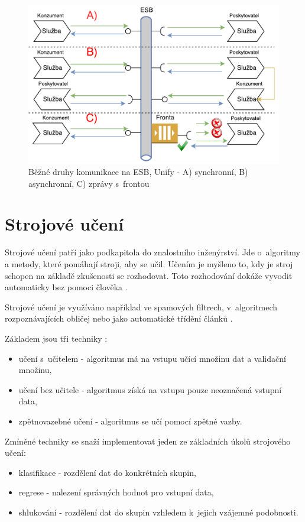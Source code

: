 \documentclass[thesis=M,czech]{FITthesis}[2012/10/20]
\newcommand{\tmpframe}[1]{\fbox{#1}}
\renewcommand{\tmpframe}[1]{#1}
\begin{document}
				\begin{figure}[htb]\centering
					\tmpframe{\includegraphics[width=\textwidth]{./img/basic_esb_communication}}		
					\caption{Běžné druhy komunikace na ESB, Unify - A) synchronní, B) asynchronní, C) zprávy s~frontou}
					\label{fig:esb_communication}
				\end{figure}
	
	\section{Strojové učení}
		Strojové učení patří jako podkapitola do znalostního inženýrství. Jde o~algoritmy a metody, které pomáhají stroji, aby se učil. Učením je myšleno to, kdy je stroj schopen na základě zkušenosti se rozhodovat. Toto rozhodování dokáže vyvodit automaticky bez pomoci člověka \cite{what-is-machine-learning}. 
		
		Strojové učení je využíváno například ve spamových filtrech, v~algoritmech rozpoznávajících obličej nebo jako automatické třídění článků \cite{machine-learning}.
		
		Základem jsou tři techniky \cite{machin-learning-and-opt}:
		
			\begin{itemize} 
				\item učení s~učitelem - algoritmus má na vstupu učící množinu dat a validační množinu,
				\item učení bez učitele - algoritmus získá na vstupu pouze neoznačená vstupní data,
				\item zpětnovazebné učení - algoritmus se učí pomocí zpětné vazby.
			\end{itemize}
		
		Zmíněné techniky se snaží implementovat jeden ze základních úkolů strojového učení:
			\begin{itemize} 
				\item klasifikace - rozdělení dat do konkrétních skupin,
				\item regrese - nalezení správných hodnot pro vstupní data,
				\item shlukování - rozdělení dat do skupin vzhledem k~jejich vzájemné podobnosti.
			\end{itemize}
			
\end{document}
